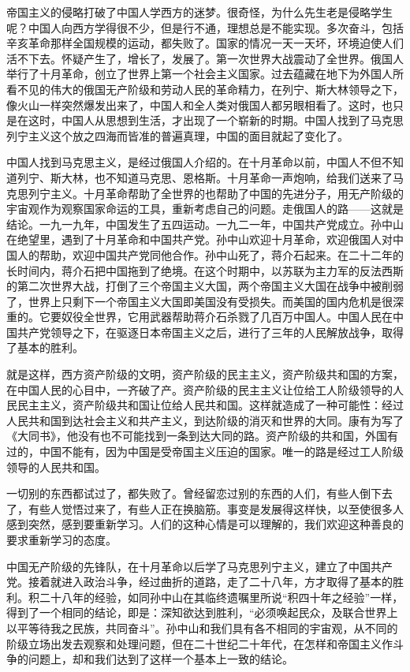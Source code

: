 帝国主义的侵略打破了中国人学西方的迷梦。很奇怪，为什么先生老是侵略学生呢？中国人向西方学得很不少，但是行不通，理想总是不能实现。多次奋斗，包括辛亥革命那样全国规模的运动，都失败了。国家的情况一天一天坏，环境迫使人们活不下去。怀疑产生了，增长了，发展了。第一次世界大战震动了全世界。俄国人举行了十月革命，创立了世界上第一个社会主义国家。过去蕴藏在地下为外国人所看不见的伟大的俄国无产阶级和劳动人民的革命精力，在列宁、斯大林领导之下，像火山一样突然爆发出来了，中国人和全人类对俄国人都另眼相看了。这时，也只是在这时，中国人从思想到生活，才出现了一个崭新的时期。中国人找到了马克思列宁主义这个放之四海而皆准的普遍真理，中国的面目就起了变化了。

中国人找到马克思主义，是经过俄国人介绍的。在十月革命以前，中国人不但不知道列宁、斯大林，也不知道马克思、恩格斯。十月革命一声炮响，给我们送来了马克思列宁主义。十月革命帮助了全世界的也帮助了中国的先进分子，用无产阶级的宇宙观作为观察国家命运的工具，重新考虑自己的问题。走俄国人的路——这就是结论。一九一九年，中国发生了五四运动。一九二一年，中国共产党成立。孙中山在绝望里，遇到了十月革命和中国共产党。孙中山欢迎十月革命，欢迎俄国人对中国人的帮助，欢迎中国共产党同他合作。孙中山死了，蒋介石起来。在二十二年的长时间内，蒋介石把中国拖到了绝境。在这个时期中，以苏联为主力军的反法西斯的第二次世界大战，打倒了三个帝国主义大国，两个帝国主义大国在战争中被削弱了，世界上只剩下一个帝国主义大国即美国没有受损失。而美国的国内危机是很深重的。它要奴役全世界，它用武器帮助蒋介石杀戮了几百万中国人。中国人民在中国共产党领导之下，在驱逐日本帝国主义之后，进行了三年的人民解放战争，取得了基本的胜利。

就是这样，西方资产阶级的文明，资产阶级的民主主义，资产阶级共和国的方案，在中国人民的心目中，一齐破了产。资产阶级的民主主义让位给工人阶级领导的人民民主主义，资产阶级共和国让位给人民共和国。这样就造成了一种可能性：经过人民共和国到达社会主义和共产主义，到达阶级的消灭和世界的大同。康有为写了《大同书》，他没有也不可能找到一条到达大同的路。资产阶级的共和国，外国有过的，中国不能有，因为中国是受帝国主义压迫的国家。唯一的路是经过工人阶级领导的人民共和国。

一切别的东西都试过了，都失败了。曾经留恋过别的东西的人们，有些人倒下去了，有些人觉悟过来了，有些人正在换脑筋。事变是发展得这样快，以至使很多人感到突然，感到要重新学习。人们的这种心情是可以理解的，我们欢迎这种善良的要求重新学习的态度。

中国无产阶级的先锋队，在十月革命以后学了马克思列宁主义，建立了中国共产党。接着就进入政治斗争，经过曲折的道路，走了二十八年，方才取得了基本的胜利。积二十八年的经验，如同孙中山在其临终遗嘱里所说“积四十年之经验”一样，得到了一个相同的结论，即是：深知欲达到胜利，“必须唤起民众，及联合世界上以平等待我之民族，共同奋斗”。孙中山和我们具有各不相同的宇宙观，从不同的阶级立场出发去观察和处理问题，但在二十世纪二十年代，在怎样和帝国主义作斗争的问题上，却和我们达到了这样一个基本上一致的结论。

